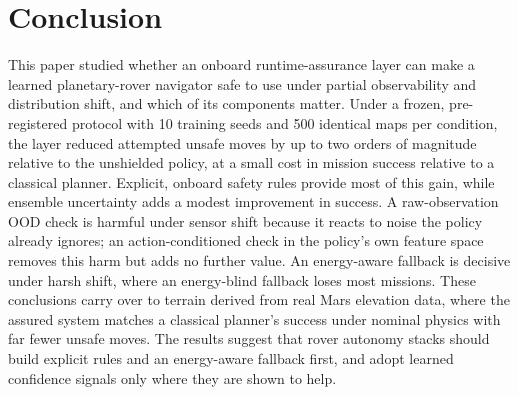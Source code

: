 \documentclass[conference]{IEEEtran}
\begin{document}
\section{Conclusion}
This paper studied whether an onboard runtime-assurance layer can make a learned planetary-rover navigator safe to use
under partial observability and distribution shift, and which of its components matter. Under a frozen, pre-registered
protocol with 10 training seeds and 500 identical maps per condition, the layer reduced attempted unsafe moves by up to two
orders of magnitude relative to the unshielded policy, at a small cost in mission success relative to a classical
planner. Explicit, onboard safety rules provide most of this gain, while ensemble uncertainty adds a modest improvement in
success. A raw-observation OOD check is harmful under sensor shift because it reacts to noise the policy already ignores;
an action-conditioned check in the policy's own feature space removes this harm but adds no further value. An
energy-aware fallback is decisive under harsh shift, where an energy-blind fallback loses most missions. These
conclusions carry over to terrain derived from real Mars elevation data, where the assured system matches a classical
planner's success under nominal physics with far fewer unsafe moves. The results suggest that rover autonomy stacks
should build explicit rules and an energy-aware fallback first, and adopt learned confidence signals only where they are
shown to help.



\end{document}
